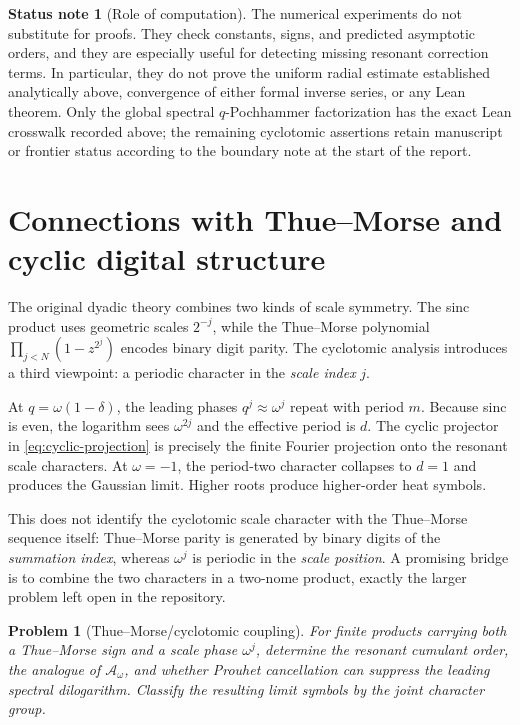 \documentclass[11pt]{article}
\newtheorem{problem}[theorem]{Problem}
\theoremstyle{definition}
\newtheorem{status}[theorem]{Status note}
\begin{document}
\begin{status}[Role of computation]
The numerical experiments do not substitute for proofs.  They check constants,
signs, and predicted asymptotic orders, and they are especially useful for
detecting missing resonant correction terms.  In particular, they do not prove
the uniform radial estimate established analytically above, convergence of
either formal inverse series, or any Lean theorem.  Only the global spectral
$q$-Pochhammer factorization has the exact Lean crosswalk recorded above; the
remaining cyclotomic assertions retain manuscript or frontier status according
to the boundary note at the start of the report.
\end{status}

\section{Connections with Thue--Morse and cyclic digital structure}

The original dyadic theory combines two kinds of scale symmetry.  The sinc product uses geometric scales $2^{-j}$, while the Thue--Morse polynomial
\(
 \prod_{j<N}(1-z^{2^j})
\)
encodes binary digit parity.  The cyclotomic analysis introduces a third viewpoint: a periodic character in the \emph{scale index} $j$.

At $q=\omega(1-\delta)$, the leading phases $q^j\approx\omega^j$ repeat with period $m$.  Because sinc is even, the logarithm sees $\omega^{2j}$ and the effective period is $d$.  The cyclic projector in \cref{eq:cyclic-projection} is precisely the finite Fourier projection onto the resonant scale characters.  At $\omega=-1$, the period-two character collapses to $d=1$ and produces the Gaussian limit.  Higher roots produce higher-order heat symbols.

This does not identify the cyclotomic scale character with the Thue--Morse sequence itself: Thue--Morse parity is generated by binary digits of the \emph{summation index}, whereas $\omega^j$ is periodic in the \emph{scale position}.  A promising bridge is to combine the two characters in a two-nome product, exactly the larger problem left open in the repository.

\begin{problem}[Thue--Morse/cyclotomic coupling]
For finite products carrying both a Thue--Morse sign and a scale phase $\omega^j$, determine the resonant cumulant order, the analogue of $\mathscr A_\omega$, and whether Prouhet cancellation can suppress the leading spectral dilogarithm.  Classify the resulting limit symbols by the joint character group.
\end{problem}
\end{document}
